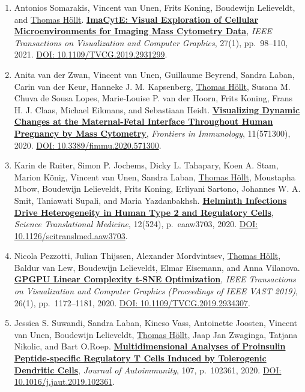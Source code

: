 \documentclass[10pt,a4paper,roman,final]{moderncv}
\newcommand*\highlightauthor[1]{\underline{#1}}
\begin{document}
\begin{enumerate}[leftmargin=0cm,start=2]
\item
Antonios Somarakis, Vincent van Unen, Frits Koning, Boudewijn Lelieveldt, and \highlightauthor{Thomas Höllt}.
\href{https://www.thomashollt.com/publications/2019_imacyte/}{\textbf{ImaCytE: Visual Exploration of Cellular Microenvironments for Imaging Mass Cytometry Data}},
\emph{IEEE Transactions on Visualization and Computer Graphics}, 27(1), pp.~98--110,
2021.
\href{https://doi.org/10.1109/TVCG.2019.2931299}{DOI: 10.1109/\allowbreak TVCG.2019.2931299}.


\item
Anita van der Zwan, Vincent van Unen, Guillaume Beyrend, Sandra Laban, Carin van der Keur, Hanneke J. M. Kapsenberg, \highlightauthor{Thomas Höllt}, Susana M. Chuva de Sousa Lopes, Marie-Louise P. van der Hoorn, Frits Koning, Frans H. J. Claas, Michael Eikmans, and Sebastiaan Heidt.
\href{https://www.thomashollt.com/publications/2020_front_immunol/}{\textbf{Visualizing Dynamic Changes at the Maternal-Fetal Interface Throughout Human Pregnancy by Mass Cytometry}},
\emph{Frontiers in Immunology}, 11(571300),
2020.
\href{https://doi.org/10.3389/fimmu.2020.571300}{DOI: 10.3389/\allowbreak fimmu.2020.571300}.


\item
Karin de Ruiter, Simon P. Jochems, Dicky L. Tahapary, Koen A. Stam, Marion König, Vincent van Unen, Sandra Laban, \highlightauthor{Thomas Höllt}, Moustapha Mbow, Boudewijn Lelieveldt, Frits Koning, Erliyani Sartono, Johannes W. A. Smit, Taniawati Supali, and Maria Yazdanbakhsh.
\href{https://www.thomashollt.com/publications/2020_helminth/}{\textbf{Helminth Infections Drive Heterogeneity in Human Type 2 and Regulatory Cells}},
\emph{Science Translational Medicine}, 12(524), p.~eaaw3703,
2020.
\href{https://doi.org/10.1126/scitranslmed.aaw3703}{DOI: 10.1126/\allowbreak scitranslmed.aaw3703}.


\item
Nicola Pezzotti, Julian Thijssen, Alexander Mordvintsev, \highlightauthor{Thomas Höllt}, Baldur van Lew, Boudewijn Lelieveldt, Elmar Eisemann, and Anna Vilanova.
\href{https://www.thomashollt.com/publications/2019_vis_GPUtSNE/}{\textbf{GPGPU Linear Complexity t-SNE Optimization}},
\emph{IEEE Transactions on Visualization and Computer Graphics (Proceedings of IEEE VAST 2019)}, 26(1), pp.~1172--1181,
2020.
\href{https://doi.org/10.1109/TVCG.2019.2934307}{DOI: 10.1109/\allowbreak TVCG.2019.2934307}.


\item
Jessica S. Suwandi, Sandra Laban, Kincso Vass, Antoinette Joosten, Vincent van Unen, Boudewijn Lelieveldt, \highlightauthor{Thomas Höllt}, Jaap Jan Zwaginga, Tatjana Nikolic, and Bart O.Roep.
\href{https://www.thomashollt.com/publications/2019_JofAutoimmunity/}{\textbf{Multidimensional Analyses of Proinsulin Peptide-specific Regulatory T Cells Induced by Tolerogenic Dendritic Cells}},
\emph{Journal of Autoimmunity}, 107, p.~102361,
2020.
\href{https://doi.org/10.1016/j.jaut.2019.102361}{DOI: 10.1016/\allowbreak j.jaut.2019.102361}.



\end{enumerate}
\end{document}

